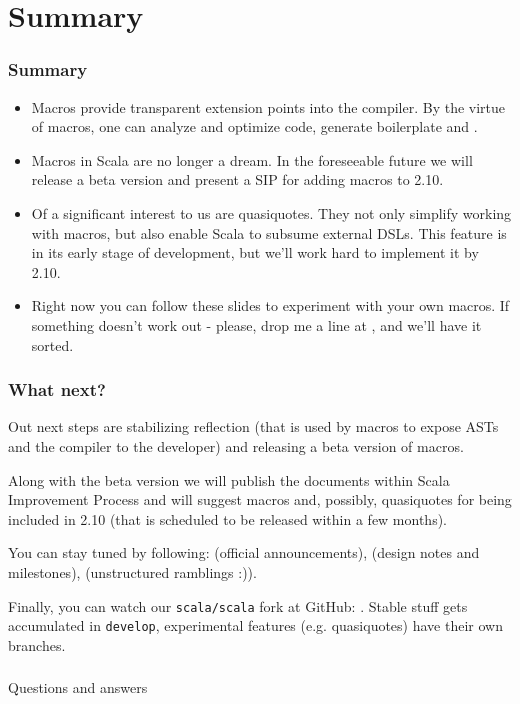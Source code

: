 \documentclass[hyperref={bookmarks=false}]{beamer}
\begin{document}
\section{Summary}

\begin{frame}[t,fragile]
\frametitle{Summary}
\begin{itemize}
\item Macros provide transparent extension points into the compiler. By the virtue of macros, one can analyze and optimize code, generate boilerplate and .
\item Macros in Scala are no longer a dream. In the foreseeable future we will release a beta version and present a SIP for adding macros to 2.10.
\item Of a significant interest to us are quasiquotes. They not only simplify working with macros, but also enable Scala to subsume external DSLs. This feature is in its early stage of development, but we'll work hard to implement it by 2.10.
\item Right now you can follow these slides to experiment with your own macros. If something doesn't work out - please, drop me a line at , and we'll have it sorted.
\end{itemize}
\end{frame}

\begin{frame}[t,fragile]
\frametitle{What next?}

Out next steps are stabilizing reflection (that is used by macros to expose ASTs and the compiler to the developer) and releasing a beta version of macros.

Along with the beta version we will publish the documents within Scala Improvement Process and will suggest macros and, possibly, quasiquotes for being included in 2.10 (that is scheduled to be released within a few months).

You can stay tuned by following:  (official announcements),  (design notes and milestones),  (unstructured ramblings :)).

Finally, you can watch our \texttt{scala/scala} fork at GitHub: . Stable stuff gets accumulated in \texttt{develop}, experimental features (e.g. quasiquotes) have their own branches.
\end{frame}

\begin{frame}[c, fragile]
\frametitle{}

\centering
{\Large Questions and answers}\\

\centering
{}

\end{frame}
\end{document}
